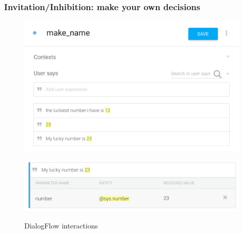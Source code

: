 \documentclass{beamer}
\begin{document}
\begin{frame}
\frametitle{Invitation/Inhibition: make your own decisions}
\begin{figure}
	\centering
	\includegraphics[width=0.75\linewidth]{images/invitation_inhibition}
	\label{fig:invitationinhibition}
\end{figure}

\begin{figure}
	\centering
	\includegraphics[width=0.7\linewidth]{images/invitation_inhibition_param}
	\label{fig:invitationinhibitionparam}
	\caption{DialogFlow interactions}
\end{figure}

\end{frame}
\end{document}

